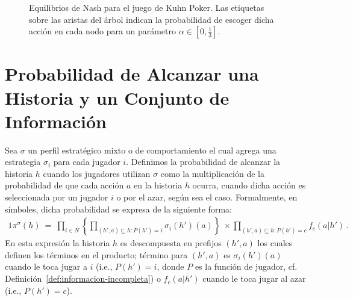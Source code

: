 \begin{figure}[h]
\begin{center}
\caption{Equilibrios de Nash para el juego de Kuhn Poker. Las etiquetas sobre las aristas del árbol indican la probabilidad de escoger dicha acción en cada nodo para un parámetro $\alpha \in \left[ 0,\frac{1}{3} \right]$.}
\label{fig:kuhn-poker-estrategias}
\end{center}
\end{figure}

\section{Probabilidad de Alcanzar una Historia y un Conjunto de Información}
\label{sec:probabilidad-historia}

Sea $\sigma$ un perfil estratégico mixto o de comportamiento el cual agrega una estrategia $\sigma_i$ para cada jugador $i$. Definimos la probabilidad de alcanzar la historia $h$ cuando los jugadores utilizan $\sigma$ como la multiplicación de la probabilidad de que cada acción $a$ en la historia $h$ ocurra, cuando dicha acción es seleccionada por un jugador $i$ o por el azar, según sea el caso. Formalmente, en símboles, dicha probabilidad se expresa de la siguiente forma:
\begin{alignat}{1}
  \pi^\sigma(h)\
    =\ \prod_{i\in N} \left\{ \prod_{(h',a)\sqsubseteq h : P(h')=i} \sigma_i(h')(a) \right\}\ \times \prod_{(h',a)\sqsubseteq h : P(h')=c} f_c(a|h') \,. 
\end{alignat}
En esta expresión la historia $h$ es descompuesta en prefijos $(h',a)$ los cuales definen los términos en el producto; término para $(h',a)$ es $\sigma_i(h')(a)$ cuando le toca jugar a $i$ (i.e., $P(h')=i$, donde $P$ es la función de jugador, cf. Definición~\ref{def:informacion-incompleta}) o $f_c(a|h')$ cuando le toca jugar al azar (i.e., $P(h')=c$).

